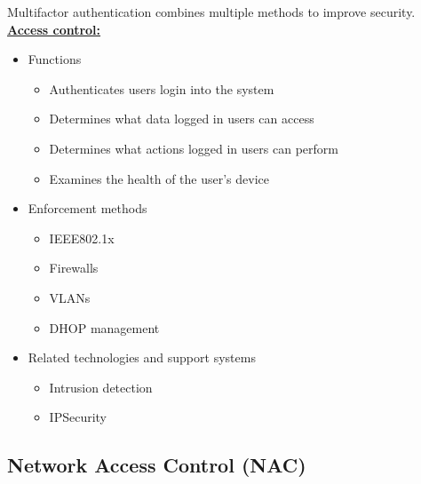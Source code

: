 \documentclass[12pt]{article}
\begin{document}
Multifactor authentication combines multiple methods to improve security.\\
\textbf{\underline{Access control:}}
\begin{multicols}{2}
	\begin{itemize}
		\item Functions
		\begin{itemize}
			\item Authenticates users login into the system
			\item Determines what data logged in users can access
			\item Determines what actions logged in users can perform
			\item Examines the health of the user's device
		\end{itemize}
		\item Enforcement methods
		\begin{itemize}
			\item IEEE802.1x
			\item Firewalls
			\item VLANs
			\item DHOP management
		\end{itemize}
		\item Related technologies and support systems
		\begin{itemize}
			\item Intrusion detection
			\item IPSecurity
		\end{itemize}
	\end{itemize}
\end{multicols}

 
 \subsection{Network Access Control (NAC)}
\end{document}
